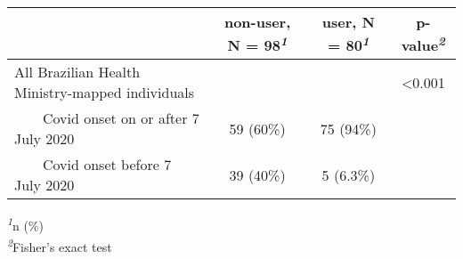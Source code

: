 \setlength{\LTpost}{0mm}
\begin{longtable}{lccc}
\toprule
 & \textbf{non-user}, N = 98\textsuperscript{\textit{1}} & \textbf{user}, N = 80\textsuperscript{\textit{1}} & \textbf{p-value}\textsuperscript{\textit{2}} \\ 
\midrule
All Brazilian Health Ministry-mapped individuals &  &  & <0.001 \\ 
    Covid onset on or after 7 July 2020 & 59 (60\%) & 75 (94\%) &  \\ 
    Covid onset before 7 July 2020 & 39 (40\%) & 5 (6.3\%) &  \\ 
\bottomrule
\end{longtable}
\begin{minipage}{\linewidth}
\textsuperscript{\textit{1}}n (\%)\\
\textsuperscript{\textit{2}}Fisher's exact test\\
\end{minipage}

